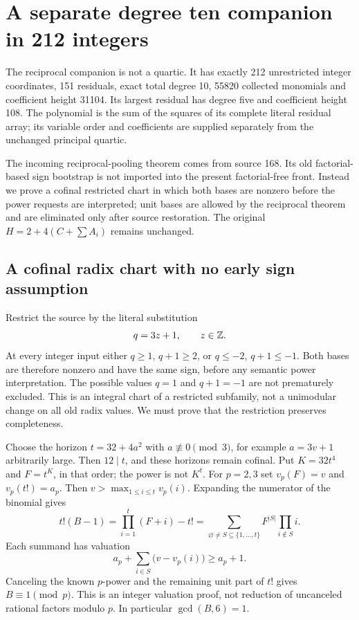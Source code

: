 \section{A separate degree ten companion in 212 integers}
\label{sec:reciprocal22}
The reciprocal companion is not a quartic. It has exactly 212 unrestricted
integer coordinates, 151 residuals, exact total degree 10, 55820 collected
monomials and coefficient height 31104. Its largest residual has degree
five and coefficient height 108. The polynomial is the sum of the squares
of its complete literal residual array; its variable order and coefficients
are supplied separately from the unchanged principal quartic.

The incoming reciprocal-pooling theorem comes from source 168. Its old
factorial-based sign bootstrap is not imported into the present factorial-free
front. Instead we prove a cofinal restricted chart in which both bases are
nonzero before the power requests are interpreted; unit bases are allowed
by the reciprocal theorem and are eliminated only after source restoration. The original
$H=2+4(C+\sum A_i)$ remains unchanged.

\subsection{A cofinal radix chart with no early sign assumption}
Restrict the source by the literal substitution
\[
 q=3z+1,\qquad z\in\mathbb Z.
\]
At every integer input either $q\ge1$, $q+1\ge2$, or $q\le-2$,
$q+1\le-1$. Both bases are therefore nonzero and have the same sign,
before any semantic power interpretation. The possible values $q=1$
and $q+1=-1$ are not prematurely excluded. This is an integral chart
of a restricted subfamily, not a unimodular change on all old radix values.
We must prove that the restriction preserves completeness.

Choose the horizon $t=32+4a^2$ with $a\not\equiv0\pmod3$, for example
$a=3v+1$ arbitrarily large. Then $12\mid t$, and these horizons remain
cofinal. Put $K=32t^4$ and $F=t^K$, in that order; the power is not $K^t$.
For $p=2,3$ set $v_p(F)=v$ and $v_p(t!)=a_p$. Then
$v>\max_{1\le i\le t}v_p(i)$. Expanding the numerator of the binomial gives
\[
 t!(B-1)=\prod_{i=1}^t(F+i)-t!
 =\sum_{\varnothing\ne S\subseteq\{1,\ldots,t\}}
       F^{|S|}\prod_{i\notin S}i.
\]
Each summand has valuation
\[
 a_p+\sum_{i\in S}\bigl(v-v_p(i)\bigr)\ge a_p+1.
\]
Canceling the known $p$-power and the remaining unit part of $t!$ gives
$B\equiv1\pmod p$. This is an integer valuation proof, not reduction of
uncanceled rational factors modulo $p$. In particular $\gcd(B,6)=1$.


